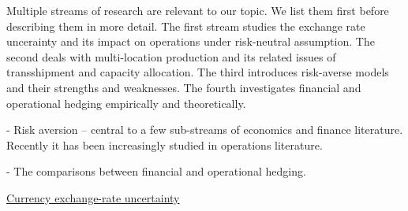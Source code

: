 \documentclass[mnsc,nonblindrev,copyedit]{informs2_wz} %
\begin{document}
\medskip

Multiple streams of research are relevant to our topic.  We list them first before describing them in more detail. The first stream studies the exchange rate uncerainty and its impact on operations under risk-neutral assumption. The second deals with multi-location production and its related issues of transshipment and capacity allocation. The third introduces risk-averse models and their strengths and weaknesses. The fourth investigates financial and operational hedging empirically and theoretically. 


- Risk aversion -- central to a few sub-streams of economics and finance literature. Recently it has been increasingly studied in operations literature. %

- The comparisons between financial and operational hedging. %

\medskip

\noindent \underline{Currency exchange-rate uncertainty} 
\end{document}
